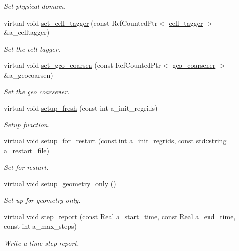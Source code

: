 \begin{DoxyCompactItemize}
\begin{DoxyCompactList}\small\item\em Set physical domain. \end{DoxyCompactList}\item 
virtual void \hyperlink{classplasma__engine_a8b9c650665023a59885a0849cff18a18}{set\+\_\+cell\+\_\+tagger} (const Ref\+Counted\+Ptr$<$ \hyperlink{classcell__tagger}{cell\+\_\+tagger} $>$ \&a\+\_\+celltagger)
\begin{DoxyCompactList}\small\item\em Set the cell tagger. \end{DoxyCompactList}\item 
virtual void \hyperlink{classplasma__engine_a79f083f21ef475ebcb338e5bcda58f2a}{set\+\_\+geo\+\_\+coarsen} (const Ref\+Counted\+Ptr$<$ \hyperlink{classgeo__coarsener}{geo\+\_\+coarsener} $>$ \&a\+\_\+geocoarsen)
\begin{DoxyCompactList}\small\item\em Set the geo coarsener. \end{DoxyCompactList}\item 
virtual void \hyperlink{classplasma__engine_aa05c10204653e7141173918da7874a10}{setup\+\_\+fresh} (const int a\+\_\+init\+\_\+regrids)
\begin{DoxyCompactList}\small\item\em Setup function. \end{DoxyCompactList}\item 
virtual void \hyperlink{classplasma__engine_acb4383dc638b9f0a47d419d502207c76}{setup\+\_\+for\+\_\+restart} (const int a\+\_\+init\+\_\+regrids, const std\+::string a\+\_\+restart\+\_\+file)
\begin{DoxyCompactList}\small\item\em Set for restart. \end{DoxyCompactList}\item 
virtual void \hyperlink{classplasma__engine_a3456034bbb7f416598d38535aad94aec}{setup\+\_\+geometry\+\_\+only} ()
\begin{DoxyCompactList}\small\item\em Set up for geometry only. \end{DoxyCompactList}\item 
virtual void \hyperlink{classplasma__engine_aadb4d6377979d1ec576e6c665fcff966}{step\+\_\+report} (const Real a\+\_\+start\+\_\+time, const Real a\+\_\+end\+\_\+time, const int a\+\_\+max\+\_\+steps)
\begin{DoxyCompactList}\small\item\em Write a time step report. \end{DoxyCompactList}\item 

\end{DoxyCompactItemize}
